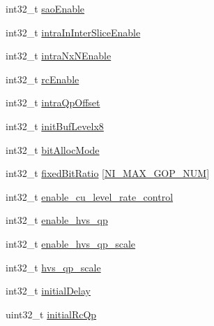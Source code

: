 \begin{DoxyCompactItemize}
\item 
int32\+\_\+t \mbox{\hyperlink{struct__ni__encoder__change__params__t_a6d4631089bf8d8cac1a887c3ed10bd8d}{sao\+Enable}}
\item 
int32\+\_\+t \mbox{\hyperlink{struct__ni__encoder__change__params__t_ae5152199754b9f763c0621e428aabc60}{intra\+In\+Inter\+Slice\+Enable}}
\item 
int32\+\_\+t \mbox{\hyperlink{struct__ni__encoder__change__params__t_a22a0ae7af1f32d0bbbc6ecd0bcee4b2d}{intra\+Nx\+N\+Enable}}
\item 
int32\+\_\+t \mbox{\hyperlink{struct__ni__encoder__change__params__t_af3132dc82b1751b641e6b3d024055122}{rc\+Enable}}
\item 
int32\+\_\+t \mbox{\hyperlink{struct__ni__encoder__change__params__t_aafbc6ec88e3b722344dc495d40566bc7}{intra\+Qp\+Offset}}
\item 
int32\+\_\+t \mbox{\hyperlink{struct__ni__encoder__change__params__t_a5072bf678599e0e72d64692ecf8bc209}{init\+Buf\+Levelx8}}
\item 
int32\+\_\+t \mbox{\hyperlink{struct__ni__encoder__change__params__t_a6346a66e3a3e2a1b68f8c6fd8e9e4ef3}{bit\+Alloc\+Mode}}
\item 
int32\+\_\+t \mbox{\hyperlink{struct__ni__encoder__change__params__t_a353df24b5bd189d29cd18a776dbda11d}{fixed\+Bit\+Ratio}} \mbox{[}\mbox{\hyperlink{ni__device__api_8h_a4fdb37034e4182c47a5c5e46a1385ff0}{N\+I\+\_\+\+M\+A\+X\+\_\+\+G\+O\+P\+\_\+\+N\+UM}}\mbox{]}
\item 
int32\+\_\+t \mbox{\hyperlink{struct__ni__encoder__change__params__t_a1d42364a75135b48b08cf33e41f153d7}{enable\+\_\+cu\+\_\+level\+\_\+rate\+\_\+control}}
\item 
int32\+\_\+t \mbox{\hyperlink{struct__ni__encoder__change__params__t_a5737df785999ec5915aa5b7d66842456}{enable\+\_\+hvs\+\_\+qp}}
\item 
int32\+\_\+t \mbox{\hyperlink{struct__ni__encoder__change__params__t_a80ece0137dc714712b9287e789a92b03}{enable\+\_\+hvs\+\_\+qp\+\_\+scale}}
\item 
int32\+\_\+t \mbox{\hyperlink{struct__ni__encoder__change__params__t_a821d5b82e11f8ba2e7fee3cbea45ae70}{hvs\+\_\+qp\+\_\+scale}}
\item 
int32\+\_\+t \mbox{\hyperlink{struct__ni__encoder__change__params__t_adcea9aaf4633b1ac1dbef53e9331fc5b}{initial\+Delay}}
\item 
uint32\+\_\+t \mbox{\hyperlink{struct__ni__encoder__change__params__t_a7e476280a18462b421f0d2ad20fd0773}{initial\+Rc\+Qp}}
\item 

\end{DoxyCompactItemize}
